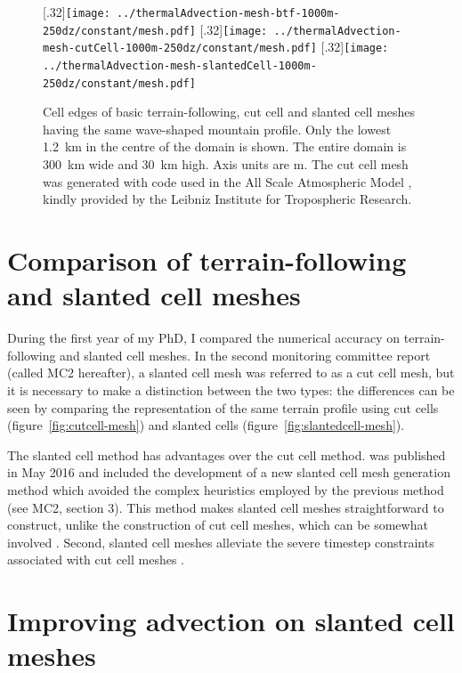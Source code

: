 \documentclass[a4paper,11pt]{article}
\begin{document}
\begin{figure}
	\centering
	[.32\linewidth]{\texttt{[image: ../thermalAdvection-mesh-btf-1000m-250dz/constant/mesh.pdf]}}
	[.32\linewidth]{\texttt{[image: ../thermalAdvection-mesh-cutCell-1000m-250dz/constant/mesh.pdf]}}
	[.32\linewidth]{\texttt{[image: ../thermalAdvection-mesh-slantedCell-1000m-250dz/constant/mesh.pdf]}}
	\caption{Cell edges of basic terrain-following, cut cell and slanted cell meshes having the same wave-shaped mountain profile.  Only the lowest \SI{1.2}{\kilo\meter} in the centre of the domain is shown.  The entire domain is \SI{300}{\kilo\meter} wide and \SI{30}{\kilo\meter} high.  Axis units are \si{\meter}.
The cut cell mesh was generated with code used in the All Scale Atmospheric Model \citep{jaehn2015}, kindly provided by the Leibniz Institute for Tropospheric Research.}
	\label{fig:meshes}
\end{figure}

\section{Comparison of terrain-following and slanted cell meshes}
\label{sec:tf-slanted-cells}

During the first year of my PhD, I compared the numerical accuracy on terrain-following and slanted cell meshes.
In the second monitoring committee report (called MC2 hereafter), a slanted cell mesh was referred to as a cut cell mesh, but it is necessary to make a distinction between the two types: the differences can be seen by comparing the representation of the same terrain profile using cut cells (figure~\ref{fig:cutcell-mesh}) and slanted cells (figure~\ref{fig:slantedcell-mesh}).

The slanted cell method has advantages over the cut cell method.
\citet{shaw-weller2016} was published in May 2016 and included the development of a new slanted cell mesh generation method which avoided the complex heuristics employed by the previous method (see MC2, section 3).
This method makes slanted cell meshes straightforward to construct, unlike the construction of cut cell meshes, which can be somewhat involved \citep{hartkopf2011}.  Second, slanted cell meshes alleviate the severe timestep constraints associated with cut cell meshes \citep{shaw-weller2016}.

\section{Improving advection on slanted cell meshes}
\label{sec:advection}
\end{document}

